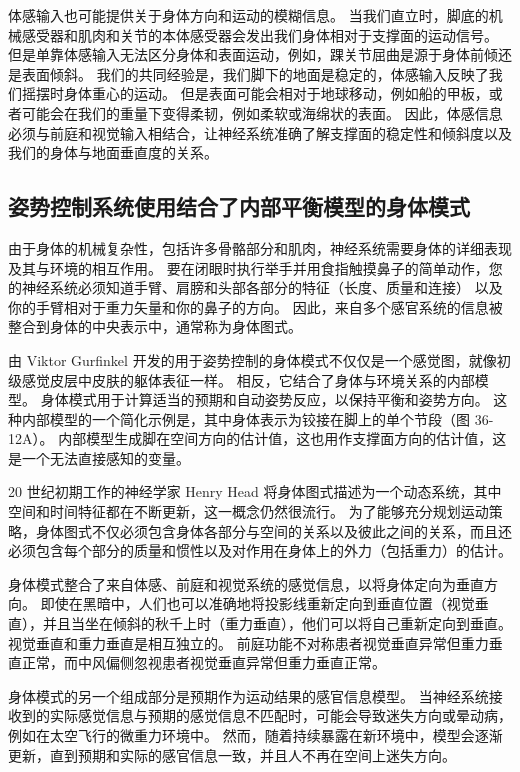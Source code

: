 体感输入也可能提供关于身体方向和运动的模糊信息。 当我们直立时，脚底的机械感受器和肌肉和关节的本体感受器会发出我们身体相对于支撑面的运动信号。 但是单靠体感输入无法区分身体和表面运动，例如，踝关节屈曲是源于身体前倾还是表面倾斜。 我们的共同经验是，我们脚下的地面是稳定的，体感输入反映了我们摇摆时身体重心的运动。 但是表面可能会相对于地球移动，例如船的甲板，或者可能会在我们的重量下变得柔韧，例如柔软或海绵状的表面。 因此，体感信息必须与前庭和视觉输入相结合，让神经系统准确了解支撑面的稳定性和倾斜度以及我们的身体与地面垂直度的关系。


\subsection{姿势控制系统使用结合了内部平衡模型的身体模式}
由于身体的机械复杂性，包括许多骨骼部分和肌肉，神经系统需要身体的详细表现及其与环境的相互作用。 要在闭眼时执行举手并用食指触摸鼻子的简单动作，您的神经系统必须知道手臂、肩膀和头部各部分的特征（长度、质量和连接） 以及你的手臂相对于重力矢量和你的鼻子的方向。 因此，来自多个感官系统的信息被整合到身体的中央表示中，通常称为身体图式。

由 Viktor Gurfinkel 开发的用于姿势控制的身体模式不仅仅是一个感觉图，就像初级感觉皮层中皮肤的躯体表征一样。 相反，它结合了身体与环境关系的内部模型。 身体模式用于计算适当的预期和自动姿势反应，以保持平衡和姿势方向。 这种内部模型的一个简化示例是，其中身体表示为铰接在脚上的单个节段（图 36-12A）。 内部模型生成脚在空间方向的估计值，这也用作支撑面方向的估计值，这是一个无法直接感知的变量。

20 世纪初期工作的神经学家 Henry Head 将身体图式描述为一个动态系统，其中空间和时间特征都在不断更新，这一概念仍然很流行。 为了能够充分规划运动策略，身体图式不仅必须包含身体各部分与空间的关系以及彼此之间的关系，而且还必须包含每个部分的质量和惯性以及对作用在身体上的外力（包括重力）的估计。

身体模式整合了来自体感、前庭和视觉系统的感觉信息，以将身体定向为垂直方向。 即使在黑暗中，人们也可以准确地将投影线重新定向到垂直位置（视觉垂直），并且当坐在倾斜的秋千上时（重力垂直），他们可以将自己重新定向到垂直。 视觉垂直和重力垂直是相互独立的。 前庭功能不对称患者视觉垂直异常但重力垂直正常，而中风偏侧忽视患者视觉垂直异常但重力垂直正常。

身体模式的另一个组成部分是预期作为运动结果的感官信息模型。 当神经系统接收到的实际感觉信息与预期的感觉信息不匹配时，可能会导致迷失方向或晕动病，例如在太空飞行的微重力环境中。 然而，随着持续暴露在新环境中，模型会逐渐更新，直到预期和实际的感官信息一致，并且人不再在空间上迷失方向。

